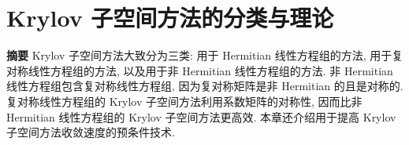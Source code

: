 \clearpage\section{{Krylov 子空间方法的分类与理论}}\label{chap:krylov-classification}
\setcounter{footnote}{0}
\noindent\textbf{{摘要}}\quad
{Krylov 子空间方法大致分为三类: 用于 Hermitian 线性方程组的方法, 用于复对称线性方程组的方法, 以及用于非 Hermitian 线性方程组的方法. 非 Hermitian 线性方程组包含复对称线性方程组, 因为复对称矩阵是非 Hermitian 的且是对称的. 复对称线性方程组的 Krylov 子空间方法利用系数矩阵的对称性, 因而比非 Hermitian 线性方程组的 Krylov 子空间方法更高效. 本章还介绍用于提高 Krylov 子空间方法收敛速度的预条件技术.}

